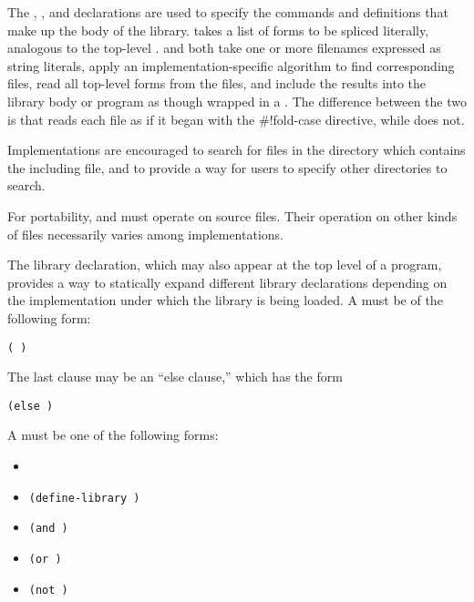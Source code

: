 The , , and  declarations are
used to specify the commands and definitions that make up the body of
the library.   takes a list of forms to be spliced
literally, analogous to the top-level .  
 and
 both take one or more filenames expressed as string literals,
apply an implementation-specific algorithm to find corresponding files,
read all top-level
forms from the files, and include the results into the library body or program as
though wrapped in a .
The difference between the two is that  reads each file
as if it began with the {\cf{}\#!fold-case} directive, while 
does not.

\begin{note}
Implementations are encouraged to search for files in the directory
which contains the including file, and to provide a way for users to
specify other directories to search.
\end{note}

\begin{note}
For portability,  and  must operate on source files.
Their operation on other kinds of files necessarily varies among
implementations.
\end{note}

The  library declaration,
which may also appear at the top level of a program,
provides a way to statically
expand different library declarations depending on the 
implementation under which the library is being loaded.  A
 must be of the following form:

{\tt(  \dotsfoo)}

The last clause may be an ``else clause,'' which has the form

{\tt(else  \dotsfoo)}

A  must be one of the following forms:

\begin{itemize}
\item {\tt{}}
\item {\tt(define-library )}
\item {\tt(and  \dotsfoo)}
\item {\tt(or  \dotsfoo)}
\item {\tt(not )}
\end{itemize}

